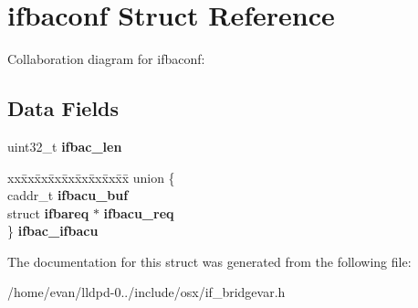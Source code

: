 \section{ifbaconf \-Struct \-Reference}
\label{structifbaconf}


\-Collaboration diagram for ifbaconf\-:
\subsection*{\-Data \-Fields}
\begin{DoxyCompactItemize}
\item 
uint32\-\_\-t {\bfseries ifbac\-\_\-len}\label{structifbaconf_ae7b003c3d2adff71b28b5ecf8c6c5270}

\item 
\begin{tabbing}
xx\=xx\=xx\=xx\=xx\=xx\=xx\=xx\=xx\=\kill
union \{\\
\>caddr\_t {\bfseries ifbacu\_buf}\\
\>struct {\bf ifbareq} $\ast$ {\bfseries ifbacu\_req}\\
\} {\bfseries ifbac\_ifbacu}\label{structifbaconf_ab945a38671676c62eb37df2f4e47dbaf}
\\

\end{tabbing}\end{DoxyCompactItemize}


\-The documentation for this struct was generated from the following file\-:\begin{DoxyCompactItemize}
\item 
/home/evan/lldpd-\/0../include/osx/if\-\_\-bridgevar.\-h\end{DoxyCompactItemize}
